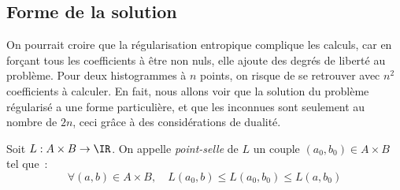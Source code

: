 \subsection{Forme de la solution}
On pourrait croire que la régularisation entropique complique les calculs, car en forçant tous les coefficients à être non nuls, elle ajoute des degrés de liberté au problème. Pour deux histogrammes à $n$ points, on risque de se retrouver avec $n^2$ coefficients à calculer. En fait, nous allons voir que la solution du problème régularisé a une forme particulière, et que les inconnues sont seulement au nombre de $2n$, ceci grâce à des considérations de dualité.

\begin{definition}
Soit $L : A \times B \rightarrow \IR$. On appelle \emph{point-selle} de $L$ un couple $(a_0,b_0) \in A\times B$ tel que~:
\[ \forall (a,b) \in A\times B, \quad L(a_0,b) \le L(a_0,b_0) \le L(a,b_0) \]
\end{definition}

